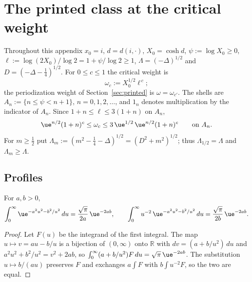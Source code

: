 \newcommand{\osomc}{\omega_c}        %
\newcommand{\osomp}{\omega}          %
\newcommand{\osX}{X_0}               %
\newcommand{\osL}{\ell}              %
\newcommand{\osbr}[1]{\langle #1\rangle}  %
\newcommand{\osHK}{\widetilde p}     %
\newcommand{\osLam}{\Lambda}         %

\section{The printed class at the critical weight}\label{app:o1st}

Throughout this appendix $x_0=i$, $d=d(i,\cdot)$, $\osX=\cosh d$, $\psi:=\log\osX\ge0$, $\osL:=\log(2\osX)/\log2=1+\psi/\log2\ge1$,
$\osLam=(-\Delta)^{1/2}$ and $D=(-\Delta-\tfrac14)^{1/2}$. For $0\le c\le1$ the critical weight is
\[
\osomc:=\osX^{1/2}\osL^{\,c};
\]
the periodization weight of Section~\ref{sec:printed} is $\osomp=\omega_{c'}$. The shells are $A_n:=\{n\le\psi<n+1\}$, $n=0,1,2,\dots$, and
$1_n$ denotes multiplication by the indicator of $A_n$. Since $1+n\le\osL\le3(1+n)$ on $A_n$,
\begin{equation}\label{os:shell}
\ue^{n/2}(1+n)^c\le\osomc\le3\,\ue^{1/2}\,\ue^{n/2}(1+n)^c\qquad\text{on }A_n .
\end{equation}
For $m\ge\tfrac12$ put $\Lambda_m:=(m^2-\tfrac14-\Delta)^{1/2}=(D^2+m^2)^{1/2}$; thus $\Lambda_{1/2}=\osLam$ and $\Lambda_m\ge\osLam$.

\subsection{Profiles}

\begin{lemma}\label{os:int}
For $a,b>0$,
\[
\int_0^\infty\ue^{-a^2u^2-b^2/u^2}\,du=\frac{\sqrt\pi}{2a}\,\ue^{-2ab},\qquad\int_0^\infty u^{-2}\,\ue^{-a^2u^2-b^2/u^2}\,du=\frac{\sqrt\pi}{2b}\,\ue^{-2ab}.
\]
\end{lemma}
\begin{proof}
Let $F(u)$ be the integrand of the first integral. The map $u\mapsto v=au-b/u$ is a bijection of $(0,\infty)$ onto $\mathbb R$ with
$dv=(a+b/u^2)\,du$ and $a^2u^2+b^2/u^2=v^2+2ab$, so $\int_0^\infty(a+b/u^2)F\,du=\sqrt\pi\,\ue^{-2ab}$. The substitution $u\mapsto b/(au)$
preserves $F$ and exchanges $a\int F$ with $b\int u^{-2}F$, so the two are equal.
\end{proof}

